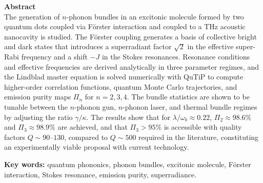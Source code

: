 \textbf{\LARGE Abstract}\\

The generation of $n$-phonon bundles in an excitonic molecule formed by two quantum dots coupled via Förster interaction and coupled to a THz acoustic nanocavity is studied. The Förster coupling generates a basis of collective bright and dark states that introduces a superradiant factor $\sqrt{2}$ in the effective super-Rabi
frequency and a shift $-J$ in the Stokes resonances. Resonance conditions and effective frequencies are derived analytically in three parameter regimes, and the Lindblad master equation is solved numerically with QuTiP to compute higher-order correlation functions, quantum Monte Carlo trajectories, and emission purity maps $\Pi_n$ for $n=2,3,4$. The bundle statistics are shown to be tunable between the $n$-phonon gun, $n$-phonon laser, and thermal bundle regimes by adjusting the ratio $\gamma/\kappa$. The results show that for $\lambda/\omega_b \approx 0.22$, $\Pi_2 \approx 98.6\%$ and $\Pi_3 \approx 98.9\%$ are achieved, and that $\Pi_3 > 95\%$ is accessible with quality factors $Q \sim 90$--$130$, compared to $Q \sim 500$ required in the literature, constituting an experimentally viable proposal with current technology.

\vspace{0.5cm}
\textbf{\small Key words: } quantum phononics, phonon bundles, excitonic molecule, Förster interaction, Stokes resonance, emission purity, superradiance.